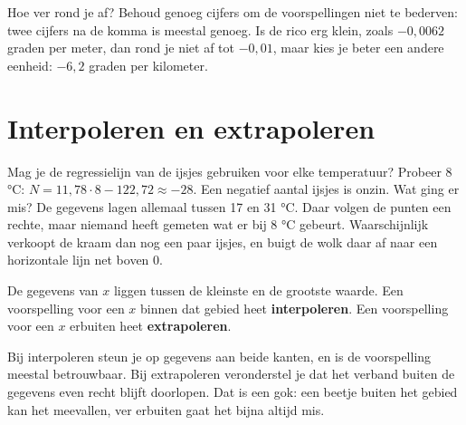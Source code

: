 Hoe ver rond je af? Behoud genoeg cijfers om de voorspellingen niet te bederven: twee cijfers na de komma is meestal genoeg. Is de rico erg klein, zoals $-0,0062$ graden per meter, dan rond je niet af tot $-0,01$, maar kies je beter een andere eenheid: $-6,2$ graden per kilometer.

\begin{oefeningen}
\end{oefeningen}

\section{Interpoleren en extrapoleren}

Mag je de regressielijn van de ijsjes gebruiken voor elke temperatuur? Probeer 8 °C: $N = 11,78 \cdot 8 - 122,72 \approx -28$. Een negatief aantal ijsjes is onzin. Wat ging er mis? De gegevens lagen allemaal tussen 17 en 31 °C. Daar volgen de punten een rechte, maar niemand heeft gemeten wat er bij 8 °C gebeurt. Waarschijnlijk verkoopt de kraam dan nog een paar ijsjes, en buigt de wolk daar af naar een horizontale lijn net boven 0.

\begin{theorie}
De gegevens van $x$ liggen tussen de kleinste en de grootste waarde. Een voorspelling voor een $x$ binnen dat gebied heet \textbf{\textcolor{accent}{interpoleren}}. Een voorspelling voor een $x$ erbuiten heet \textbf{\textcolor{accent}{extrapoleren}}.
\end{theorie}

Bij interpoleren steun je op gegevens aan beide kanten, en is de voorspelling meestal betrouwbaar. Bij extrapoleren veronderstel je dat het verband buiten de gegevens even recht blijft doorlopen. Dat is een gok: een beetje buiten het gebied kan het meevallen, ver erbuiten gaat het bijna altijd mis.

